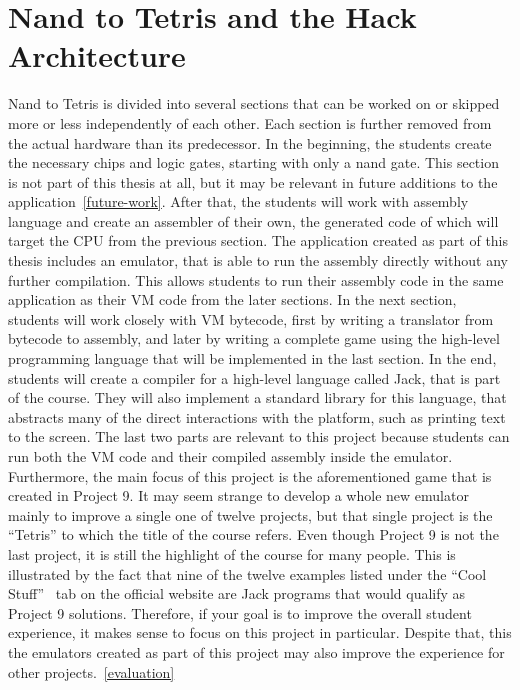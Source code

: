 \section{Nand to Tetris and the Hack Architecture}

Nand to Tetris is divided into several sections that can be worked on or skipped more or less independently of each other.
Each section is further removed from the actual hardware than its predecessor. In the beginning, the students create the necessary chips and logic gates, starting with only a nand gate. This section is not part of this thesis at all, but it may be relevant in future additions to the application~\ref{future-work}.
After that, the students will work with assembly language and create an assembler of their own, the generated code of which will target the CPU from the previous section.
The application created as part of this thesis includes an emulator, that is able to run the assembly directly without any further compilation. This allows students to run their assembly code in the same application as their VM code from the later sections.
In the next section, students will work closely with VM bytecode, first by writing a translator from bytecode to assembly, and later by writing a complete game using the high-level programming language that will be implemented in the last section.
In the end, students will create a compiler for a high-level language called Jack, that is part of the course. They will also implement a standard library for this language, that abstracts many of the direct interactions with the platform, such as printing text to the screen.
The last two parts are relevant to this project because students can run both the VM code and their compiled assembly inside the emulator. Furthermore, the main focus of this project is the aforementioned game that is created in Project 9.
It may seem strange to develop a whole new emulator mainly to improve a single one of twelve projects, but that single project is the ``Tetris'' to which the title of the course refers. Even though Project 9 is not the last project, it is still the highlight of the course for many people.
This is illustrated by the fact that nine of the twelve examples listed under the ``Cool Stuff''~\cite{n2tweb} tab on the official website are Jack programs that would qualify as Project 9 solutions.
Therefore, if your goal is to improve the overall student experience, it makes sense to focus on this project in particular.
Despite that, this the emulators created as part of this project may also improve the experience for other projects.~\ref{evaluation}

